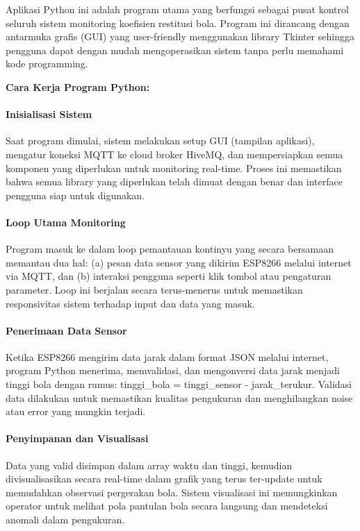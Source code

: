Aplikasi Python ini adalah program utama yang berfungsi sebagai pusat kontrol seluruh sistem monitoring koefisien restitusi bola. Program ini dirancang dengan antarmuka grafis (GUI) yang user-friendly menggunakan library Tkinter sehingga pengguna dapat dengan mudah mengoperasikan sistem tanpa perlu memahami kode programming.

\textbf{Cara Kerja Program Python:}

\paragraph{Inisialisasi Sistem} Saat program dimulai, sistem melakukan setup GUI (tampilan aplikasi), mengatur koneksi MQTT ke cloud broker HiveMQ, dan mempersiapkan semua komponen yang diperlukan untuk monitoring real-time. Proses ini memastikan bahwa semua library yang diperlukan telah dimuat dengan benar dan interface pengguna siap untuk digunakan.

\paragraph{Loop Utama Monitoring} Program masuk ke dalam loop pemantauan kontinyu yang secara bersamaan memantau dua hal: (a) pesan data sensor yang dikirim ESP8266 melalui internet via MQTT, dan (b) interaksi pengguna seperti klik tombol atau pengaturan parameter. Loop ini berjalan secara terus-menerus untuk memastikan responsivitas sistem terhadap input dan data yang masuk.

\paragraph{Penerimaan Data Sensor} Ketika ESP8266 mengirim data jarak dalam format JSON melalui internet, program Python menerima, memvalidasi, dan mengonversi data jarak menjadi tinggi bola dengan rumus: tinggi\_bola = tinggi\_sensor - jarak\_terukur. Validasi data dilakukan untuk memastikan kualitas pengukuran dan menghilangkan noise atau error yang mungkin terjadi.

\paragraph{Penyimpanan dan Visualisasi} Data yang valid disimpan dalam array waktu dan tinggi, kemudian divisualisasikan secara real-time dalam grafik yang terus ter-update untuk memudahkan observasi pergerakan bola. Sistem visualisasi ini memungkinkan operator untuk melihat pola pantulan bola secara langsung dan mendeteksi anomali dalam pengukuran.

